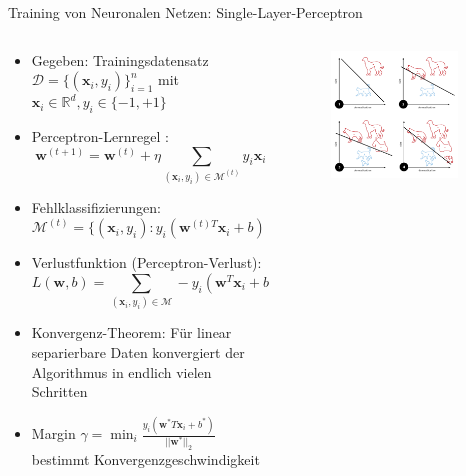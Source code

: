 \documentclass[aspectratio=1610, xcolor=dvipsnames, 9pt]{beamer}
\begin{document}
      \begin{frame}{Training von Neuronalen Netzen: Single-Layer-Perceptron}
        \begin{columns}
          \begin{column}{0.7\textwidth}
            \begin{itemize}
              \item Gegeben: Trainingsdatensatz $\mathcal{D} = \{(\mathbf{x}_i, y_i)\}_{i=1}^n$ mit $\mathbf{x}_i \in \mathbb{R}^d, y_i \in \{-1, +1\}$
              \item Perceptron-Lernregel \cite{rosenblatt1958}:
                    \begin{equation}
                       \mathbf{w}^{(t+1)} = \mathbf{w}^{(t)} + \eta \sum_{(\mathbf{x}_i, y_i) \in \mathcal{M}^{(t)}} y_i \mathbf{x}_i
                    \end{equation}
              \item Fehlklassifizierungen: $\mathcal{M}^{(t)} = \{(\mathbf{x}_i, y_i) : y_i(\mathbf{w}^{(t)T}\mathbf{x}_i + b) \leq 0\}$
              \item Verlustfunktion (Perceptron-Verlust):
              \begin{equation}
                L(\mathbf{w}, b) = \sum_{(\mathbf{x}_i, y_i) \in \mathcal{M}} -y_i(\mathbf{w}^T\mathbf{x}_i + b)
              \end{equation}
              \item Konvergenz-Theorem: Für linear separierbare Daten konvergiert der Algorithmus in endlich vielen Schritten
              \item Margin $\gamma = \min_{i} \frac{y_i(\mathbf{w}^*T\mathbf{x}_i + b^*)}{||\mathbf{w}^*||_2}$ bestimmt Konvergenzgeschwindigkeit
            \end{itemize}
          \end{column}
          \begin{column}{0.3\textwidth}
       \begin{figure}
       \centering
                   \includegraphics[width=0.9\textwidth]{images/Perceptron_example.svg.png}

\end{figure}
\end{column}
\end{columns}
\end{frame}
\end{document}
